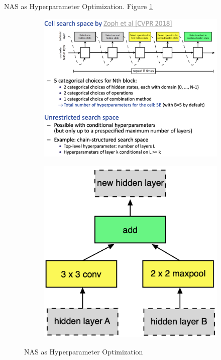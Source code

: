 \documentclass[english]{article}
\begin{document}
\item NAS as Hyperparameter Optimization. Figure \ref{nas4}  


\begin{figure}[h!]
\centering
\begin{subfigure}{.5\textwidth}
  \centering
  \includegraphics[scale=0.5]{nas4}
\end{subfigure}%
\begin{subfigure}{.5\textwidth}
  \centering
  \includegraphics[scale=0.6]{nas5}
\end{subfigure}
\caption{NAS as Hyperparameter Optimization}
  \label{nas4}
\end{figure}
\end{document}
